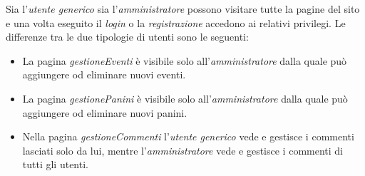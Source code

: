 Sia l'\emph{utente generico} sia l'\emph{amministratore} possono visitare tutte la pagine del sito e una volta eseguito il \emph{login} o la \emph{registrazione} accedono ai relativi privilegi.
Le differenze tra le due tipologie di utenti sono le seguenti:
\begin{itemize}
	\item La pagina \emph{gestioneEventi} è visibile solo all'\emph{amministratore} dalla quale può aggiungere od eliminare nuovi eventi.
	\item La pagina \emph{gestionePanini} è visibile solo all'\emph{amministratore} dalla quale può aggiungere od eliminare nuovi panini.
	\item Nella pagina \emph{gestioneCommenti} l'\emph{utente generico} vede e gestisce i commenti lasciati solo da lui, mentre l'\emph{amministratore} vede e gestisce i commenti di tutti gli utenti.
\end{itemize}